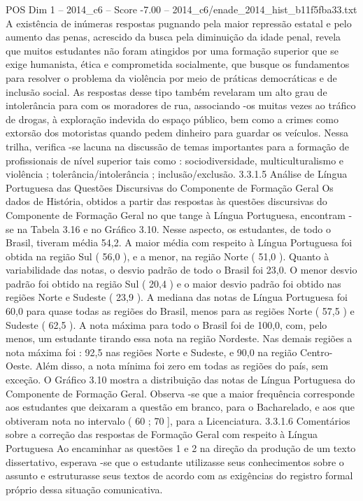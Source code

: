 \begin{textsample}{POS Dim 1 – 2014\_c6 – Score -7.00 – 2014\_c6/enade\_2014\_hist\_b11f5fba33.txt}
A existência de inúmeras respostas pugnando pela maior repressão estatal e pelo aumento das penas, acrescido da busca pela diminuição da idade penal, revela que muitos estudantes não foram atingidos por uma formação superior que se exige humanista, ética e comprometida socialmente, que busque os fundamentos para resolver o problema da violência por meio de práticas democráticas e de inclusão social.
As respostas desse tipo também revelaram um alto grau de intolerância para com os moradores de rua, associando -os muitas vezes ao tráfico de drogas, à exploração indevida do espaço público, bem como a crimes como extorsão dos motoristas quando pedem dinheiro para guardar os veículos.
Nessa trilha, verifica -se lacuna na discussão de temas importantes para a formação de profissionais de nível superior tais como : sociodiversidade, multiculturalismo e violência ; tolerância/intolerância ; inclusão/exclusão. 3.3.1.5 Análise de Língua Portuguesa das Questões Discursivas do Componente de Formação Geral Os dados de História, obtidos a partir das respostas às questões discursivas do Componente de Formação Geral no que tange à Língua Portuguesa, encontram -se na Tabela 3.16 e no Gráfico 3.10.
Nesse aspecto, os estudantes, de todo o Brasil, tiveram média 54,2.
A maior média com respeito à Língua Portuguesa foi obtida na região Sul ( 56,0 ), e a menor, na região Norte ( 51,0 ).
Quanto à variabilidade das notas, o desvio padrão de todo o Brasil foi 23,0.
O menor desvio padrão foi obtido na região Sul ( 20,4 ) e o maior desvio padrão foi obtido nas regiões Norte e Sudeste ( 23,9 ).
A mediana das notas de Língua Portuguesa foi 60,0 para quase todas as regiões do Brasil, menos para as regiões Norte ( 57,5 ) e Sudeste ( 62,5 ).
A nota máxima para todo o Brasil foi de 100,0, com, pelo menos, um estudante tirando essa nota na região Nordeste.
Nas demais regiões a nota máxima foi : 92,5 nas regiões Norte e Sudeste, e 90,0 na região Centro-Oeste.
Além disso, a nota mínima foi zero em todas as regiões do país, sem exceção.
O Gráfico 3.10 mostra a distribuição das notas de Língua Portuguesa do Componente de Formação Geral.
Observa -se que a maior frequência corresponde aos estudantes que deixaram a questão em branco, para o Bacharelado, e aos que obtiveram nota no intervalo ( 60 ; 70 ], para a Licenciatura. 3.3.1.6 Comentários sobre a correção das respostas de Formação Geral com respeito à Língua Portuguesa Ao encaminhar as questões 1 e 2 na direção da produção de um texto dissertativo, esperava -se que o estudante utilizasse seus conhecimentos sobre o assunto e estruturasse seus textos de acordo com as exigências do registro formal próprio dessa situação comunicativa.

\end{textsample}
